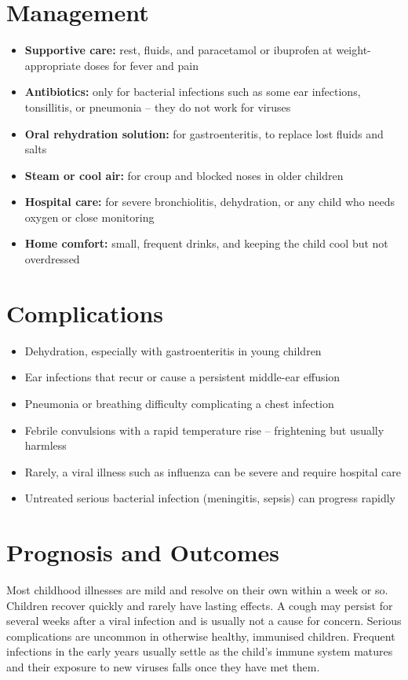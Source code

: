 \section*{Management}
\begin{itemize}
    \item \textbf{Supportive care:} rest, fluids, and paracetamol or ibuprofen at weight-appropriate doses for fever and pain
    \item \textbf{Antibiotics:} only for bacterial infections such as some ear infections, tonsillitis, or pneumonia -- they do not work for viruses
    \item \textbf{Oral rehydration solution:} for gastroenteritis, to replace lost fluids and salts
    \item \textbf{Steam or cool air:} for croup and blocked noses in older children
    \item \textbf{Hospital care:} for severe bronchiolitis, dehydration, or any child who needs oxygen or close monitoring
    \item \textbf{Home comfort:} small, frequent drinks, and keeping the child cool but not overdressed
\end{itemize}

\section*{Complications}
\begin{itemize}
    \item Dehydration, especially with gastroenteritis in young children
    \item Ear infections that recur or cause a persistent middle-ear effusion
    \item Pneumonia or breathing difficulty complicating a chest infection
    \item Febrile convulsions with a rapid temperature rise -- frightening but usually harmless
    \item Rarely, a viral illness such as influenza can be severe and require hospital care
    \item Untreated serious bacterial infection (meningitis, sepsis) can progress rapidly
\end{itemize}

\section*{Prognosis and Outcomes}
Most childhood illnesses are mild and resolve on their own within a week or so. Children recover quickly and rarely have lasting effects. A cough may persist for several weeks after a viral infection and is usually not a cause for concern. Serious complications are uncommon in otherwise healthy, immunised children. Frequent infections in the early years usually settle as the child's immune system matures and their exposure to new viruses falls once they have met them.

